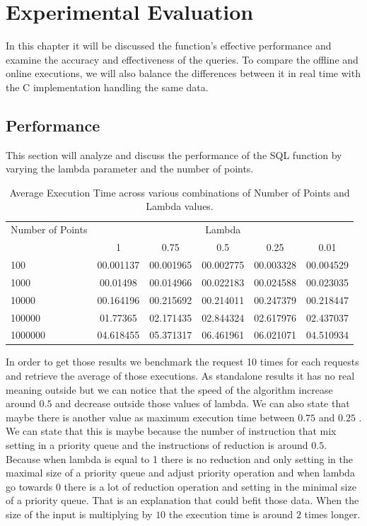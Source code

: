 
\chapter{Experimental Evaluation}

In this chapter it will be discussed the function's effective performance and examine the accuracy and effectiveness of the queries. To compare the offline and online executions, we will also balance the differences between it in real time with the C implementation handling the same data.

\section{Performance}
This section will analyze and discuss the performance of the SQL function by varying the lambda parameter and the number of points.
\begin{table}[htbp]
    \centering
    \label{tab:execution_time}
    \begin{tabular}{@{}lccccc@{}}
        \toprule
        Number of Points & \multicolumn{5}{c}{Lambda} \\
        \cmidrule{2-6}
        & 1         & 0.75       & 0.5        & 0.25       & 0.01       \\
        \midrule
        100              & 00.001137 & 00.001965 & 00.002775 & 00.003328 & 00.004529 \\
        1000             & 00.01498  & 00.014966 & 00.022183 & 00.024588 & 00.023035 \\
        10000            & 00.164196 & 00.215692 & 00.214011 & 00.247379 & 00.218447 \\
        100000           & 01.77365  & 02.171435 & 02.844324 & 02.617976 & 02.437037 \\
        1000000          & 04.618455 & 05.371317 & 06.461961 & 06.021071 & 04.510934 \\
        \bottomrule
    \end{tabular}
    \caption{Average Execution Time across various combinations of Number of Points and Lambda values.}
\end{table}

In order to get those results we benchmark the request 10 times for each requests and retrieve the average of those executions. As standalone results it has no real meaning outside but we can notice that the speed of the algorithm increase around $0.5$ and decrease outside those values of lambda. We can also state that maybe there is another value as maximum execution time between $0.75$ and $0.25$ . We can state that this is maybe because the number of instruction that mix setting in a priority queue and the instructions of reduction is around $0.5$. Because when lambda is equal to 1 there is no reduction and only setting in the maximal size of a priority queue and adjust priority operation and when lambda go towards $0$ there is a lot of reduction operation and setting in the minimal size of a priority queue. That is an explanation that could befit those data. When the size of the input is multiplying by $10$ the execution time is around $2$ times longer.

